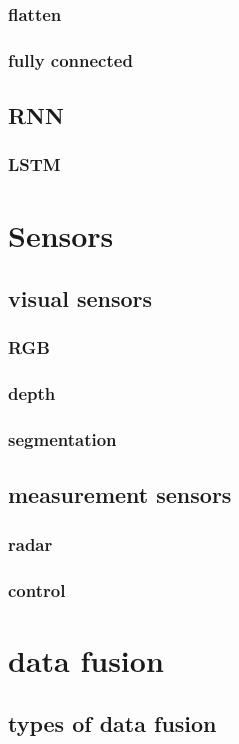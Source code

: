 \subsubsection*{flatten}
\subsubsection*{fully connected}
\subsection{RNN}
\subsubsection{LSTM}
\section{Sensors}
\subsection{visual sensors}
\subsubsection*{RGB}
\subsubsection*{depth}
\subsubsection*{segmentation}
\subsection{measurement sensors}
\subsubsection*{radar}
\subsubsection*{control}

\section{data fusion}
\subsection{types of data fusion}
